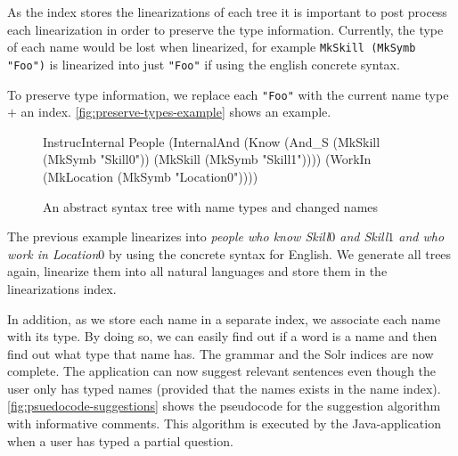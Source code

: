 As the index stores the linearizations of each tree it is important to post process each linearization in order to preserve the type information. Currently, the type of each name would be lost when linearized, for example \texttt{MkSkill (MkSymb "Foo")} is linearized into just \texttt{"Foo"} if using the english concrete syntax.

To preserve type information, we replace each \texttt{"Foo"} with the current name type $+$ an index. \autoref{fig:preserve-types-example} shows an example.

\begin{figure}[H]
\begin{terminal}
InstrucInternal People (InternalAnd (Know 
            (And_S (MkSkill (MkSymb "Skill0")) (MkSkill (MkSymb "Skill1")))) 
            (WorkIn (MkLocation (MkSymb "Location0"))))
\end{terminal}
\caption{An abstract syntax tree with name types and changed names\label{fig:preserve-types-example}}
\end{figure}

The previous example linearizes into \emph{people who know Skill$0$ and Skill$1$ and who work in Location$0$} by using the concrete syntax for English. We generate all trees again, linearize them into all natural languages and store them in the linearizations index.

In addition, as we store each name in a separate index, we associate each name with its type. By doing so, we can easily find out if a word is a name and then find out what type that name has. 
\newline
\newline
The grammar and the Solr indices are now complete. The application can now suggest relevant sentences even though the user only has typed names (provided that the names exists in the name index).  \autoref{fig:psuedocode-suggestions} shows the pseudocode for the suggestion algorithm with informative comments. This algorithm is executed by the Java-application when a user has typed a partial question.

